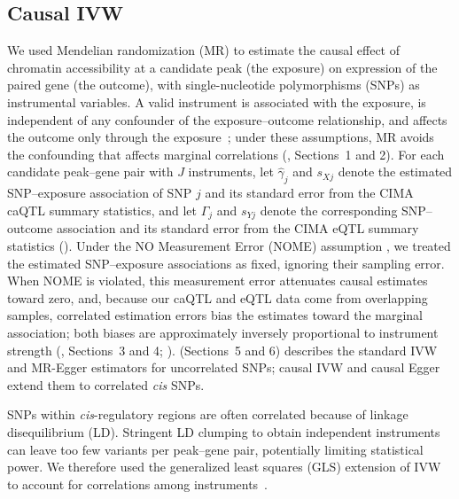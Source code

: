 \subsection{Causal IVW}
\label{sec:gls-ivw}

We used Mendelian randomization (MR) to estimate the causal effect of chromatin accessibility at a candidate peak (the exposure) on expression of the paired gene (the outcome), with single-nucleotide polymorphisms (SNPs) as instrumental variables. A valid instrument is associated with the exposure, is independent of any confounder of the exposure--outcome relationship, and affects the outcome only through the exposure~\cite{lawlor2008mendelian}; under these assumptions, MR avoids the confounding that affects marginal correlations (, Sections~1 and 2). For each candidate peak--gene pair with $J$ instruments, let \(\hat{\gamma}_j\) and \(s_{Xj}\) denote the estimated SNP--exposure association of SNP $j$ and its standard error from the CIMA caQTL summary statistics, and let \(\hat{\Gamma}_j\) and \(s_{Yj}\) denote the corresponding SNP--outcome association and its standard error from the CIMA eQTL summary statistics (). Under the NO Measurement Error (NOME) assumption \cite{bowden2016nome}, we treated the estimated SNP--exposure associations as fixed, ignoring their sampling error. When NOME is violated, this measurement error attenuates causal estimates toward zero, and, because our caQTL and eQTL data come from overlapping samples, correlated estimation errors bias the estimates toward the marginal association; both biases are approximately inversely proportional to instrument strength (, Sections~3 and 4; ).  (Sections~5 and 6) describes the standard IVW and MR-Egger estimators for uncorrelated SNPs; causal IVW and causal Egger extend them to correlated \textit{cis} SNPs.

\noindent SNPs within \textit{cis}-regulatory regions are often correlated because of linkage disequilibrium (LD). Stringent LD clumping to obtain independent instruments can leave too few variants per peak--gene pair, potentially limiting statistical power. We therefore used the generalized least squares (GLS) extension of IVW to account for correlations among instruments~\cite{burgess2016combining,burgess2017interpreting}.

